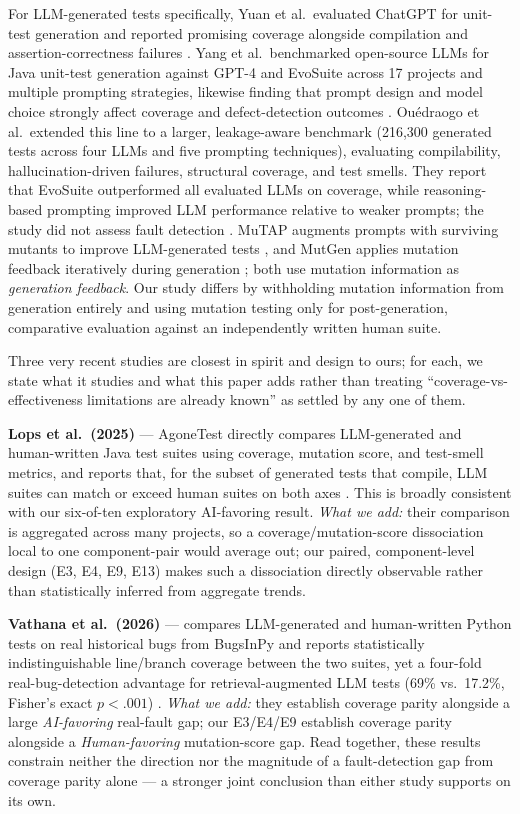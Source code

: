 \documentclass[10pt,conference]{IEEEtran}
\begin{document}
For LLM-generated tests specifically, Yuan et al.\ evaluated ChatGPT for unit-test generation and reported promising coverage alongside compilation and assertion-correctness failures \cite{yuan2023}. Yang et al.\ benchmarked open-source LLMs for Java unit-test generation against GPT-4 and EvoSuite across 17 projects and multiple prompting strategies, likewise finding that prompt design and model choice strongly affect coverage and defect-detection outcomes \cite{yang2024ase}. Ouédraogo et al.\ extended this line to a larger, leakage-aware benchmark (216{,}300 generated tests across four LLMs and five prompting techniques), evaluating compilability, hallucination-driven failures, structural coverage, and test smells. They report that EvoSuite outperformed all evaluated LLMs on coverage, while reasoning-based prompting improved LLM performance relative to weaker prompts; the study did not assess fault detection \cite{ouedraogo2026}. MuTAP augments prompts with surviving mutants to improve LLM-generated tests \cite{mutap2024}, and MutGen applies mutation feedback iteratively during generation \cite{mutgen2026}; both use mutation information as \emph{generation feedback}. Our study differs by withholding mutation information from generation entirely and using mutation testing only for post-generation, comparative evaluation against an independently written human suite.

Three very recent studies are closest in spirit and design to ours; for each, we state what it studies and what this paper adds rather than treating ``coverage-vs-effectiveness limitations are already known'' as settled by any one of them.

\textbf{Lops et al.\ (2025)} — AgoneTest directly compares LLM-generated and human-written Java test suites using coverage, mutation score, and test-smell metrics, and reports that, for the subset of generated tests that compile, LLM suites can match or exceed human suites on both axes \cite{lops2025agonetest}. This is broadly consistent with our six-of-ten exploratory AI-favoring result. \emph{What we add:} their comparison is aggregated across many projects, so a coverage/mutation-score dissociation local to one component-pair would average out; our paired, component-level design (E3, E4, E9, E13) makes such a dissociation directly observable rather than statistically inferred from aggregate trends.

\textbf{Vathana et al.\ (2026)} — compares LLM-generated and human-written Python tests on real historical bugs from BugsInPy and reports statistically indistinguishable line/branch coverage between the two suites, yet a four-fold real-bug-detection advantage for retrieval-augmented LLM tests (69\% vs.\ 17.2\%, Fisher's exact $p<.001$) \cite{vathana2026}. \emph{What we add:} they establish coverage parity alongside a large \emph{AI-favoring} real-fault gap; our E3/E4/E9 establish coverage parity alongside a \emph{Human-favoring} mutation-score gap. Read together, these results constrain neither the direction nor the magnitude of a fault-detection gap from coverage parity alone — a stronger joint conclusion than either study supports on its own.
\end{document}
